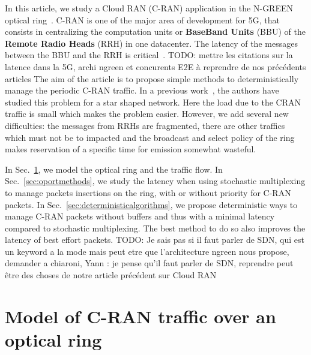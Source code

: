\documentclass[]{algotel}
\newcommand{\todo}[1]{{\color{red} TODO: {#1}}}
\begin{document}
In this article, we study a Cloud RAN (C-RAN) application in the N-GREEN optical ring~\cite{ngreenarchitecture}. C-RAN is one of the major area of development for 5G, that consists in centralizing the computation units or {\bf BaseBand Units} (BBU) of the {\bf Remote Radio Heads} (RRH) in one datacenter. The latency of the messages between the BBU and the RRH is critical~\cite{bouguen2012lte,3gpp5g}. \todo{mettre les citations sur la latence dans la 5G, archi ngreen et concurents E2E à reprendre de nos précédents articles} The aim of the article is to propose simple methods
to deterministically manage the periodic C-RAN traffic. In a previous work~\cite{dominique2018deterministic}, the authors have studied this problem for a star shaped network. Here the load due to the CRAN traffic is small which makes the problem easier. However, we add several new difficulties: the messages from RRHs are fragmented, there are other traffics which must not be to impacted and the broadcast and select policy of the ring makes reservation of a specific time for emission somewhat wasteful. 

In Sec.~\ref{sec:model}, we model the optical ring and the traffic flow. In Sec.~\ref{sec:oportmethods}, we study the latency when using stochastic multiplexing to manage packets insertions on the ring, with or without priority for C-RAN packets. In Sec.~\ref{sec:deterministicalgorithms}, we propose deterministic ways to manage C-RAN packets without buffers and thus with a minimal latency compared to stochastic multiplexing. The best method to do so also improves the latency of best effort packets.
\todo{Je sais pas si il faut parler de SDN, qui est un keyword a la mode mais peut etre que l'architecture ngreen nous propose, demander a chiaroni, 
Yann : je pense qu'il faut parler de SDN, reprendre peut être des choses de notre article précédent sur Cloud RAN}


\section{Model of C-RAN traffic over an optical ring}
\label{sec:model}
% 
% 
          
\end{document}
